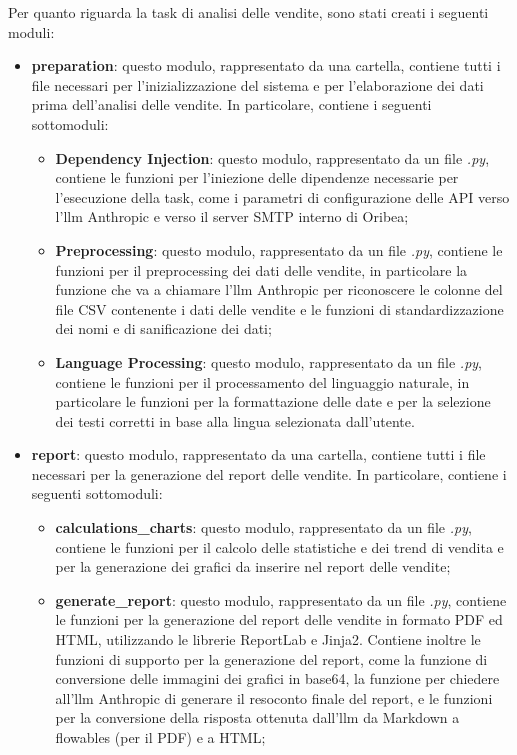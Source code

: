 Per quanto riguarda la task di analisi delle vendite, sono stati creati i seguenti moduli:
\begin{itemize}
    \item \textbf{preparation}: questo modulo, rappresentato da una cartella, contiene tutti i file necessari per l'inizializzazione del sistema e per l'elaborazione dei dati prima dell'analisi delle vendite. In particolare, contiene i seguenti sottomoduli:
    \begin{itemize}
        \item \textbf{Dependency Injection}: questo modulo, rappresentato da un file \emph{.py}, contiene le funzioni per l'iniezione delle dipendenze necessarie per l'esecuzione della task, come i parametri di configurazione delle API verso l'\gls{llm}\glsfirstoccur{} Anthropic e verso il server SMTP interno di Oribea;
        \item \textbf{Preprocessing}: questo modulo, rappresentato da un file \emph{.py}, contiene le funzioni per il preprocessing dei dati delle vendite, in particolare la funzione che va a chiamare l'\gls{llm} Anthropic per riconoscere le colonne del file CSV contenente i dati delle vendite e le funzioni di standardizzazione dei nomi e di sanificazione dei dati;
        \item \textbf{Language Processing}: questo modulo, rappresentato da un file \emph{.py}, contiene le funzioni per il processamento del linguaggio naturale, in particolare le funzioni per la formattazione delle date e per la selezione dei testi corretti in base alla lingua selezionata dall'utente.
    \end{itemize}
    \item \textbf{report}: questo modulo, rappresentato da una cartella, contiene tutti i file necessari per la generazione del report delle vendite. In particolare, contiene i seguenti sottomoduli:
    \begin{itemize}
        \item \textbf{calculations\_charts}: questo modulo, rappresentato da un file \emph{.py}, contiene le funzioni per il calcolo delle statistiche e dei trend di vendita e per la generazione dei grafici da inserire nel report delle vendite;
        \item \textbf{generate\_report}: questo modulo, rappresentato da un file \emph{.py}, contiene le funzioni per la generazione del report delle vendite in formato PDF ed HTML, utilizzando le librerie ReportLab e Jinja2. Contiene inoltre le funzioni di supporto per la generazione del report, come la funzione di conversione delle immagini dei grafici in base64, la funzione per chiedere all'\gls{llm} Anthropic di generare il resoconto finale del report, e le funzioni per la conversione della risposta ottenuta dall'\gls{llm} da Markdown a flowables (per il PDF) e a HTML;

\end{itemize}
\end{itemize}

